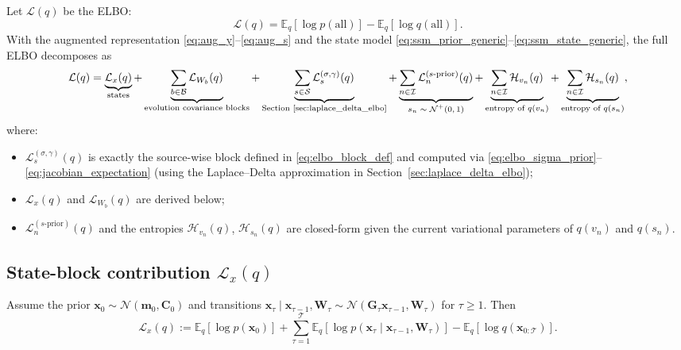 \documentclass[11pt]{article}
\newcommand{\1}{\mathbb{I}}
\newcommand{\N}{\mathcal{N}}
\newcommand{\E}{\mathbb{E}}
\begin{document}
Let $\mathcal{L}(q)$ be the ELBO:
\[
\mathcal{L}(q)=\E_q[\log p(\text{all})]-\E_q[\log q(\text{all})].
\]
With the augmented representation \eqref{eq:aug_y}--\eqref{eq:aug_s} and the state model
\eqref{eq:ssm_prior_generic}--\eqref{eq:ssm_state_generic}, the full ELBO decomposes as
\begin{equation}
\mathcal{L}(q)
=
\underbrace{\mathcal{L}_{x}(q)}_{\text{states}}
+
\underbrace{\sum_{b\in\mathcal{B}}\mathcal{L}_{W_b}(q)}_{\text{evolution covariance blocks}}
+
\underbrace{\sum_{s\in\mathcal{S}}\mathcal{L}_{s}^{(\sigma,\gamma)}(q)}_{\text{Section~\ref{sec:laplace_delta_elbo}}}
+
\underbrace{\sum_{n\in\mathcal{I}}\mathcal{L}_{n}^{(s\text{-prior})}(q)}_{\text{$s_n\sim\N^+(0,1)$}}
+
\underbrace{\sum_{n\in\mathcal{I}}\mathcal{H}_{v_n}(q)}_{\text{entropy of $q(v_n)$}}
+
\underbrace{\sum_{n\in\mathcal{I}}\mathcal{H}_{s_n}(q)}_{\text{entropy of $q(s_n)$}},
\label{eq:full_elbo_decomp}
\end{equation}
where:
\begin{itemize}
\item $\mathcal{L}_{s}^{(\sigma,\gamma)}(q)$ is exactly the source-wise block defined in
\eqref{eq:elbo_block_def} and computed via \eqref{eq:elbo_sigma_prior}--\eqref{eq:jacobian_expectation}
(using the Laplace--Delta approximation in Section~\ref{sec:laplace_delta_elbo});
\item $\mathcal{L}_{x}(q)$ and $\mathcal{L}_{W_b}(q)$ are derived below;
\item $\mathcal{L}_{n}^{(s\text{-prior})}(q)$ and the entropies $\mathcal{H}_{v_n}(q)$, $\mathcal{H}_{s_n}(q)$
are closed-form given the current variational parameters of $q(v_n)$ and $q(s_n)$.
\end{itemize}

\subsection{State-block contribution \texorpdfstring{$\mathcal{L}_{x}(q)$}{Lx(q)}}

Assume the prior $\bm x_0\sim\N(\bm m_0,\bm C_0)$ and transitions
$\bm x_\tau\mid \bm x_{\tau-1},\bm W_\tau\sim\N(\bm G_\tau \bm x_{\tau-1},\bm W_\tau)$ for $\tau\ge 1$.
Then
\begin{equation}
\mathcal{L}_{x}(q)
:=
\E_q[\log p(\bm x_0)] + \sum_{\tau=1}^{\mathcal{T}}\E_q[\log p(\bm x_\tau\mid \bm x_{\tau-1},\bm W_\tau)]
-\E_q[\log q(\bm x_{0:\mathcal{T}})].
\label{eq:Lx_def}
\end{equation}

\end{document}
